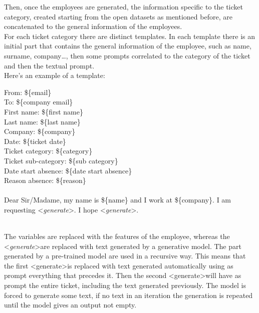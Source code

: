 \documentclass{article}
\begin{document}
Then, once the employees are generated, the information specific to the ticket category, created starting from the open datasets as mentioned before, are concatenated to the general information of the employees. \\
For each ticket category there are distinct templates. In each template there is an initial part that contains the general information of the employee, such as name, surname, company\dots, then some prompts correlated to the category of the ticket and then the textual prompt. \\
Here's an example of a template: \\
\begin{adjustwidth}{1cm}{}
From: \$\{email\} \\
To: \$\{company email\} \\
First name: \$\{first name\}\\
Last name: \$\{last name\}\\
Company: \$\{company\}\\
Date: \$\{ticket date\}\\
Ticket category: \$\{category\}\\
Ticket sub-category: \$\{sub category\} \\
Date start absence: \$\{date start absence\} \\
Reason absence: \$\{reason\} \\ 
\\
Dear Sir/Madame, my name is \$\{name\} and I work at \$\{company\}. I am requesting \textless \textit{generate}\textgreater. I hope \textless \textit{generate}\textgreater. \\ \\
\end{adjustwidth} 
The variables are replaced with the features of the employee, whereas the \textless \textit{generate}\textgreater \space are replaced with text generated by a generative model. The part generated by a pre-trained model are used in a recursive way. This means that the first \textless generate\textgreater \space is replaced with text generated automatically using as prompt everything that precedes it. Then the second \textless generate\textgreater \space will have as prompt the entire ticket, including the text generated previously. The model is forced to generate some text, if no text in an iteration the generation is repeated until the model gives an output not empty.
\end{document}
